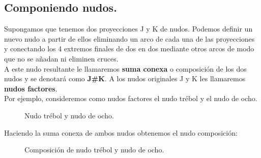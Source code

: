 \documentclass[14pt]{extarticle}
\begin{document}
\newpage
\subsection{Componiendo nudos.}\label{seccion3}
Supongamos que tenemos dos proyecciones J y K de nudos. Podemos definir un nuevo nudo a partir de ellos eliminando un arco de cada una de las proyecciones y conectando los 4 extremos finales de dos en dos mediante otros arcos de modo que no se añadan ni eliminen cruces.\\
A este nudo resultante le llamaremos \textbf{suma conexa} o composición de los dos nudos y se denotará como \textbf{J\#K}. A los nudos originales J y K les llamaremos \textbf{nudos factores}. \\

Por ejemplo, consideremos como nudos factores el nudo trébol y el nudo de ocho. 
  \begin{figure}[h!]
  	\centering
  	\caption{Nudo trébol y nudo de ocho.}
  	\label{comp1} 
  \end{figure}
  
Haciendo la suma conexa de ambos nudos obtenemos el nudo composición:
  \begin{figure}[h!]
  	\centering
  	\caption{Composición de nudo trébol y nudo de ocho.}
  	\label{comp2} 
  \end{figure}
  
\end{document}
